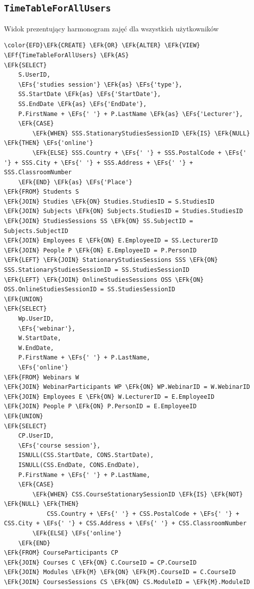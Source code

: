 \documentclass[11pt]{article}
\newcommand{\EFs}[1]{\textcolor{EFs}{#1}} %
\newcommand{\EFk}[1]{\textcolor{EFk}{\textbf{#1}}} %
\newcommand{\EFf}[1]{\textcolor{EFf}{#1}} %
\begin{document}
\subsection{\texttt{TimeTableForAllUsers}}
\label{sec:org526f20d}
Widok prezentujący harmonogram zajęć dla wszystkich użytkowników
\begin{Code}
\begin{Verbatim}
\color{EFD}\EFk{CREATE} \EFk{OR} \EFk{ALTER} \EFk{VIEW} \EFf{TimeTableForAllUsers} \EFk{AS}
\EFk{SELECT} 
    S.UserID,
    \EFs{'studies session'} \EFk{as} \EFs{'type'},
    SS.StartDate \EFk{as} \EFs{'StartDate'},
    SS.EndDate \EFk{as} \EFs{'EndDate'},
    P.FirstName + \EFs{' '} + P.LastName \EFk{as} \EFs{'Lecturer'},
    \EFk{CASE} 
        \EFk{WHEN} SSS.StationaryStudiesSessionID \EFk{IS} \EFk{NULL} \EFk{THEN} \EFs{'online'}
        \EFk{ELSE} SSS.Country + \EFs{' '} + SSS.PostalCode + \EFs{' '} + SSS.City + \EFs{' '} + SSS.Address + \EFs{' '} + SSS.ClassroomNumber
    \EFk{END} \EFk{as} \EFs{'Place'}
\EFk{FROM} Students S
\EFk{JOIN} Studies \EFk{ON} Studies.StudiesID = S.StudiesID
\EFk{JOIN} Subjects \EFk{ON} Subjects.StudiesID = Studies.StudiesID
\EFk{JOIN} StudiesSessions SS \EFk{ON} SS.SubjectID = Subjects.SubjectID
\EFk{JOIN} Employees E \EFk{ON} E.EmployeeID = SS.LecturerID
\EFk{JOIN} People P \EFk{ON} E.EmployeeID = P.PersonID
\EFk{LEFT} \EFk{JOIN} StationaryStudiesSessions SSS \EFk{ON} SSS.StationaryStudiesSessionID = SS.StudiesSessionID
\EFk{LEFT} \EFk{JOIN} OnlineStudiesSessions OSS \EFk{ON} OSS.OnlineStudiesSessionID = SS.StudiesSessionID
\EFk{UNION}
\EFk{SELECT} 
    Wp.UserID, 
    \EFs{'webinar'},
    W.StartDate,
    W.EndDate,
    P.FirstName + \EFs{' '} + P.LastName,
    \EFs{'online'}
\EFk{FROM} Webinars W 
\EFk{JOIN} WebinarParticipants WP \EFk{ON} WP.WebinarID = W.WebinarID
\EFk{JOIN} Employees E \EFk{ON} W.LecturerID = E.EmployeeID
\EFk{JOIN} People P \EFk{ON} P.PersonID = E.EmployeeID
\EFk{UNION}
\EFk{SELECT}
    CP.UserID,
    \EFs{'course session'},
    ISNULL(CSS.StartDate, CONS.StartDate),
    ISNULL(CSS.EndDate, CONS.EndDate),
    P.FirstName + \EFs{' '} + P.LastName,
    \EFk{CASE}
        \EFk{WHEN} CSS.CourseStationarySessionID \EFk{IS} \EFk{NOT} \EFk{NULL} \EFk{THEN}
            CSS.Country + \EFs{' '} + CSS.PostalCode + \EFs{' '} + CSS.City + \EFs{' '} + CSS.Address + \EFs{' '} + CSS.ClassroomNumber
        \EFk{ELSE} \EFs{'online'}
    \EFk{END}
\EFk{FROM} CourseParticipants CP
\EFk{JOIN} Courses C \EFk{ON} C.CourseID = CP.CourseID
\EFk{JOIN} Modules \EFk{M} \EFk{ON} \EFk{M}.CourseID = C.CourseID
\EFk{JOIN} CoursesSessions CS \EFk{ON} CS.ModuleID = \EFk{M}.ModuleID

\end{Verbatim}
\end{Code}
\end{document}
